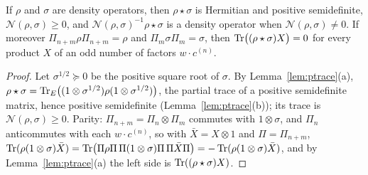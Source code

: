 \begin{lemma}[Positivity]\label{lem:positive}
If $\rho$ and $\sigma$ are density operators, then $\rho\star\sigma$ is Hermitian and positive
semidefinite, $\mathcal N(\rho,\sigma)\geq0$, and $\mathcal N(\rho,\sigma)^{-1}\rho\star\sigma$ is a
density operator when $\mathcal N(\rho,\sigma)\neq0$. If moreover $\Pi_{n+m}\rho\Pi_{n+m}=\rho$ and
$\Pi_m\sigma\Pi_m=\sigma$, then $\operatorname{Tr}\bigl((\rho\star\sigma)X\bigr)=0$ for every product $X$ of an
odd number of factors $w\cdot c^{(n)}$.
\end{lemma}
\begin{proof}
Let $\sigma^{1/2}\succeq0$ be the positive square root of $\sigma$. By Lemma~\ref{lem:ptrace}(a),
$\rho\star\sigma=\operatorname{Tr}_{E}\bigl((1\otimes\sigma^{1/2})\rho(1\otimes\sigma^{1/2})\bigr)$, the partial
trace of a positive semidefinite matrix, hence positive semidefinite (Lemma~\ref{lem:ptrace}(b));
its trace is $\mathcal N(\rho,\sigma)\geq0$. Parity: $\Pi_{n+m}=\Pi_n\otimes\Pi_m$ commutes with
$1\otimes\sigma$, and $\Pi_n$ anticommutes with each $w\cdot c^{(n)}$, so with $\bar X=X\otimes1$
and $\Pi=\Pi_{n+m}$,
$\operatorname{Tr}(\rho(1\otimes\sigma)\bar X)=\operatorname{Tr}\bigl(\Pi\rho\Pi\,\Pi(1\otimes\sigma)\Pi\,\Pi\bar X\Pi\bigr)
=-\operatorname{Tr}(\rho(1\otimes\sigma)\bar X)$, and by Lemma~\ref{lem:ptrace}(a) the left side is
$\operatorname{Tr}((\rho\star\sigma)X)$.
\end{proof}


